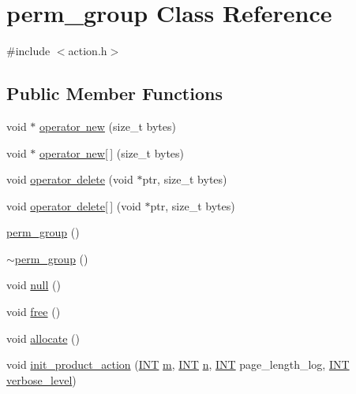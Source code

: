 \hypertarget{classperm__group}{}\section{perm\+\_\+group Class Reference}
\label{classperm__group}


{\ttfamily \#include $<$action.\+h$>$}

\subsection*{Public Member Functions}
\begin{DoxyCompactItemize}
\item 
void $\ast$ \mbox{\hyperlink{classperm__group_abc983a33e0bb57238ba9c675127b3e17}{operator new}} (size\+\_\+t bytes)
\item 
void $\ast$ \mbox{\hyperlink{classperm__group_a0ec21707d8b438d62b3ba25b9542fa1e}{operator new\mbox{[}$\,$\mbox{]}}} (size\+\_\+t bytes)
\item 
void \mbox{\hyperlink{classperm__group_a083e32b8e8d0851b42add30bf17e5a8a}{operator delete}} (void $\ast$ptr, size\+\_\+t bytes)
\item 
void \mbox{\hyperlink{classperm__group_ae18ceca5324c549296b04ea3f8351fe8}{operator delete\mbox{[}$\,$\mbox{]}}} (void $\ast$ptr, size\+\_\+t bytes)
\item 
\mbox{\hyperlink{classperm__group_a7c2f0ad47542ce415fc3d23c9d382911}{perm\+\_\+group}} ()
\item 
\mbox{\hyperlink{classperm__group_a7f2df62d0b24cbdb2ee4cfca3bb8d21f}{$\sim$perm\+\_\+group}} ()
\item 
void \mbox{\hyperlink{classperm__group_a0dd587ee6a789c607ed7a0c74b0f9f46}{null}} ()
\item 
void \mbox{\hyperlink{classperm__group_a07c6076d33cda4233128ace0cb4dcb19}{free}} ()
\item 
void \mbox{\hyperlink{classperm__group_a597c9991f5c1d8b16cc74bcd7003ee73}{allocate}} ()
\item 
void \mbox{\hyperlink{classperm__group_ab7716a70d704336a7d895261c902a6bf}{init\+\_\+product\+\_\+action}} (\mbox{\hyperlink{galois_8h_a09fddde158a3a20bd2dcadb609de11dc}{I\+NT}} \mbox{\hyperlink{classperm__group_a1b0cc375208b3e7c8da7c9caf38fbc0e}{m}}, \mbox{\hyperlink{galois_8h_a09fddde158a3a20bd2dcadb609de11dc}{I\+NT}} \mbox{\hyperlink{classperm__group_aca09b99f70d6bffb5bfb0b6a7b105403}{n}}, \mbox{\hyperlink{galois_8h_a09fddde158a3a20bd2dcadb609de11dc}{I\+NT}} page\+\_\+length\+\_\+log, \mbox{\hyperlink{galois_8h_a09fddde158a3a20bd2dcadb609de11dc}{I\+NT}} \mbox{\hyperlink{simeon_8_c_a818073fbcc2f439e7c56952f67386122}{verbose\+\_\+level}})

\end{DoxyCompactItemize}
